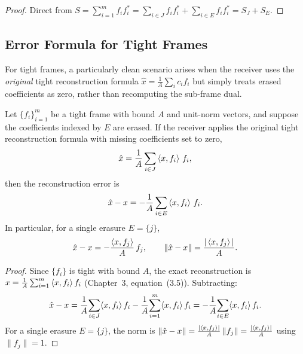 \begin{proof}
Direct from $S = \sum_{i=1}^m f_if_i^* = \sum_{i\in J}f_if_i^* +
\sum_{i\in E}f_if_i^* = S_J + S_E$.
\end{proof}

\subsection{Error Formula for Tight Frames}
\label{subsec:tight-erasure-error}

For tight frames, a particularly clean scenario arises when the receiver
uses the \emph{original} tight reconstruction formula
$\hat x = \tfrac{1}{A}\sum_i c_i f_i$ but simply treats erased
coefficients as zero, rather than recomputing the sub-frame dual.

\begin{proposition}
\label{prop:tight-erasure-error}
Let $\{f_i\}_{i=1}^m$ be a tight frame with bound $A$ and unit-norm
vectors, and suppose the coefficients indexed by $E$ are erased. If the
receiver applies the original tight reconstruction formula with missing
coefficients set to zero,
\[
  \hat x = \frac{1}{A}\sum_{i\in J}\left\langle x, f_i \right\rangle\,f_i,
\]
then the reconstruction error is
\begin{equation}
\label{eq:tight-erasure-error}
  \hat x - x = -\frac{1}{A}\sum_{i\in E}\left\langle x, f_i \right\rangle\,f_i.
\end{equation}
In particular, for a single erasure $E=\{j\}$,
\[
  \hat x - x = -\frac{\left\langle x, f_j \right\rangle}{A}\,f_j,
  \qquad
  \left\| \hat x - x \right\| = \frac{|\left\langle x, f_j \right\rangle|}{A}.
\]
\end{proposition}

\begin{proof}
Since $\{f_i\}$ is tight with bound $A$, the exact reconstruction is
$x = \tfrac{1}{A}\sum_{i=1}^m \left\langle x, f_i \right\rangle f_i$ (Chapter~3,
equation~(3.5)). Subtracting:
\[
  \hat x - x = \frac{1}{A}\!\sum_{i\in J}\!\left\langle x, f_i \right\rangle f_i
  - \frac{1}{A}\!\sum_{i=1}^m\!\left\langle x, f_i \right\rangle f_i
  = -\frac{1}{A}\!\sum_{i\in E}\!\left\langle x, f_i \right\rangle f_i.
\]
For a single erasure $E=\{j\}$, the norm is
$\|\hat x-x\|=\tfrac{|\left\langle x, f_j \right\rangle|}{A}\,\|f_j\|=\tfrac{|\left\langle x, f_j \right\rangle|}{A}$
using $\|f_j\|=1$.
\end{proof}

